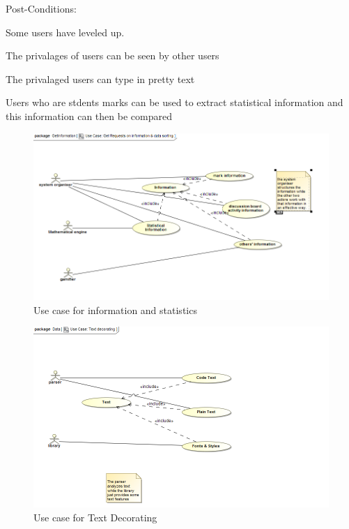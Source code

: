 \documentclass[a4paper,12pt]{article}
\begin{document}
Post-Conditions:
\begin{list_type}

\item Some users have leveled up.
\item The privalages of users can be seen by other users
\item The privalaged users can type in pretty text
\item Users who are stdents marks can be used to extract statistical information and this information can then be compared
\end{list_type}
      

\begin{figure}[ht!]
\centering
\includegraphics[width=120mm]{images/capture.png}
\caption{Use case for information and statistics \label{overflow}}
\end{figure}



\begin{figure}[ht!]
\centering
\includegraphics[width=120mm]{images/capture2.png}
\caption{Use case for Text Decorating \label{overflow}}
\end{figure}
\end{document}
